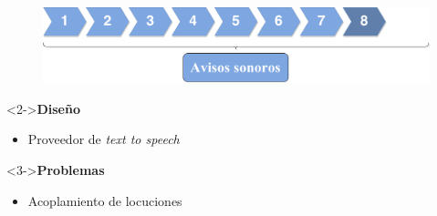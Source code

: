 \begin{slide}
  \begin{center}
    \begin{figure}[!h]
      \includegraphics[height=0.27\textheight]{img/ite8.png}
    \end{figure}
    \vspace{0.5cm}
    \begin{minipage}[b]{0.4\linewidth}
      \begin{block}<2->{\textbf{Diseño}}
        \begin{itemize}
          \item Proveedor de \emph{text to speech}
        \end{itemize}
      \end{block}
    \end{minipage}
    \hspace{0.5cm}
    \begin{minipage}[b]{0.4\linewidth}
      \begin{block}<3->{\textbf{Problemas}}
        \begin{itemize}
          \item Acoplamiento de locuciones
        \end{itemize}
      \end{block}
    \end{minipage}
  \end{center}
\end{slide}

